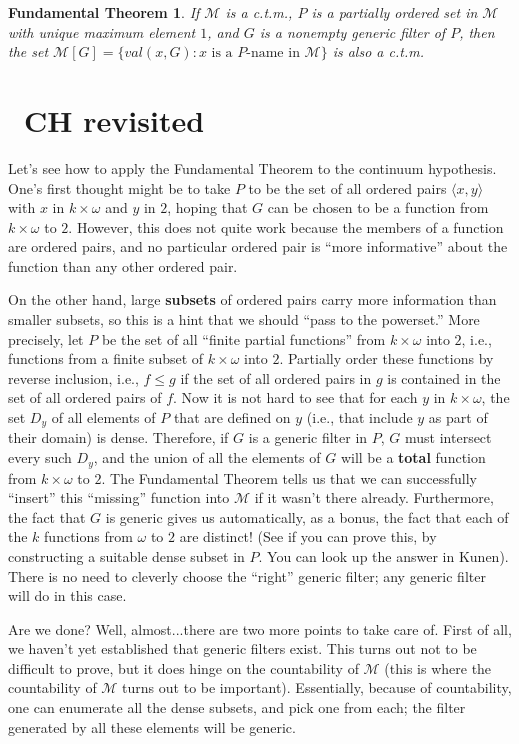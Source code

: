 \documentclass[10pt]{article}
\newcommand\axiom[1]{\textmd{#1}}
\newtheorem*{teo}{Fundamental Theorem}
\theoremstyle{definition}
\begin{document}
\begin{teo}
If $\mathcal M$ is a c.t.m., $P$ is a partially ordered set in $\mathcal M$ with unique maximum element $1$, and $G$ is a nonempty generic filter of $P$, then the set $\mathcal M[G] = \{val(x,G) : x \text{ is a }P\text{-name in }\mathcal M\}$ is also a c.t.m.
\end{teo}

\section{\axiom{~CH} revisited}

Let's see how to apply the Fundamental Theorem to the continuum hypothesis. One's first thought might be to take $P$ to be the set of all ordered pairs $\langle x,y\rangle$ with $x$ in $k \times \omega$ and $y$ in $2$, hoping that $G$ can be chosen to be a function from $k \times \omega$ to $2$. However, this does not quite work because the members of a function are ordered pairs, and no particular ordered pair is ``more informative'' about the function than any other ordered pair.

On the other hand, large \textbf{subsets} of ordered pairs carry more information than smaller subsets, so this is a hint that we should ``pass to the powerset.'' More precisely, let $P$ be the set of all ``finite partial functions'' from $k \times \omega$ into $2$, i.e., functions from a finite subset of $k \times \omega$ into $2$. Partially order these functions by reverse inclusion, i.e., $f \leq g$ if the set of all ordered pairs in $g$ is contained in the set of all ordered pairs of $f$. Now it is not hard to see that for each $y$ in $k \times \omega$, the set $D_y$ of all elements of $P$ that are defined on $y$ (i.e., that include $y$ as part of their domain) is dense. Therefore, if $G$ is a generic filter in $P$, $G$ must intersect every such $D_y$, and the union of all the elements of $G$ will be a \textbf{total} function from $k \times \omega$ to $2$. The Fundamental Theorem tells us that we can successfully ``insert'' this ``missing'' function into $\mathcal M$ if it wasn't there already. Furthermore, the fact that $G$ is generic gives us automatically, as a bonus, the fact that each of the $k$ functions from $\omega$ to $2$ are distinct! (See if you can prove this, by constructing a suitable dense subset in $P$. You can look up the answer in Kunen). There is no need to cleverly choose the ``right'' generic filter; any generic filter will do in this case.

Are we done? Well, almost...there are two more points to take care of. First of all, we haven't yet established that generic filters exist. This turns out not to be difficult to prove, but it does hinge on the countability of $\mathcal M$ (this is where the countability of $\mathcal M$ turns out to be important). Essentially, because of countability, one can enumerate all the dense subsets, and pick one from each; the filter generated by all these elements will be generic.
\end{document}
